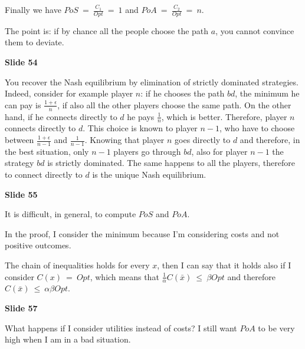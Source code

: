 \noindent Finally we have $PoS~=~\frac{C_1}{Opt}~=~1$ and 
$PoA~=~\frac{C_2}{Opt}~=~n$.

\noindent The point is: if by chance all the people choose the path $a$, you 
cannot convince them to deviate.

\bigskip
\noindent \textbf{Slide 54}

\noindent You recover the Nash equilibrium by elimination of strictly dominated 
strategies. Indeed, consider for example player $n$: if he chooses the path 
$bd$, the minimum he can pay is $\frac{1+\epsilon}{n}$, if also all the other 
players choose the same path. On the other hand, if he connects directly to 
$d$ he pays $\frac{1}{n}$, which is better. Therefore, player $n$ connects 
directly to $d$. This choice is known to player $n-1$, who have to choose 
between $\frac{1+\epsilon}{n-1}$ and $\frac{1}{n-1}$. Knowing that player $n$ 
goes directly to $d$ and therefore, in the best situation, only $n-1$ players 
go through $bd$, also for player $n-1$ the strategy $bd$ is strictly 
dominated. The same happens to all the players, therefore to connect directly 
to $d$ is the unique Nash equilibrium.

\bigskip
\noindent \textbf{Slide 55}

\noindent It is difficult, in general, to compute $PoS$ and $PoA$.

\noindent In the proof, I consider the minimum because I'm considering 
costs and not positive outcomes.

\noindent The chain of inequalities holds for every $x$, then I can say 
that it holds also if I consider $C(x)~=~Opt$, which means that 
$\frac{1}{\alpha}C(\bar{x})~\leq~\beta Opt$ and therefore 
$C(\bar{x})~\leq~\alpha \beta Opt$.

\bigskip
\noindent \textbf{Slide 57}

\noindent What happens if I consider utilities instead of costs? I still 
want $PoA$ to be very high when I am in a bad situation.

%
